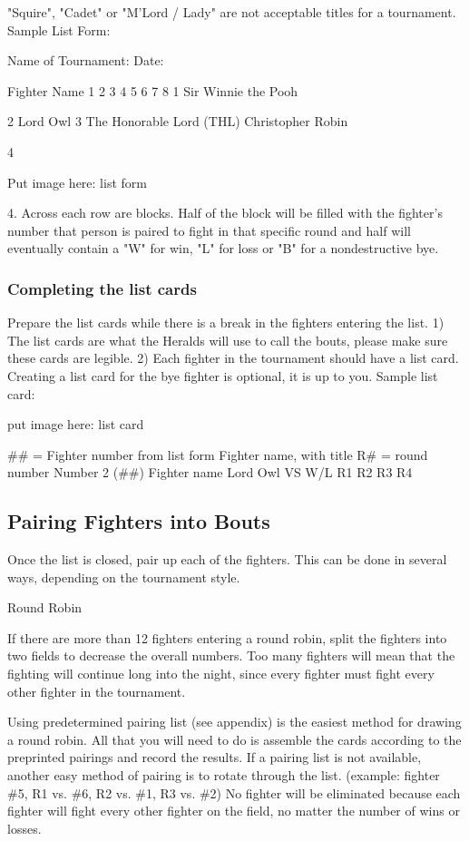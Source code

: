 \documentclass{article}
\begin{document}
"Squire", "Cadet" or "M’Lord / Lady" are not acceptable titles for a tournament.
Sample List Form:

Name of Tournament: Date:

Fighter Name 1 2 3 4 5 6 7 8
1 Sir Winnie the Pooh

2 Lord Owl
3
The Honorable Lord (THL)
Christopher Robin

4

Put image here: list form


4. Across each row are blocks. Half of the block will be filled with the fighter’s number that person is
paired to fight in that specific round and half will eventually contain a "W" for win, "L" for loss or
"B" for a nondestructive bye.


\subsubsection{Completing the list cards}

Prepare the list cards while there is a break in the fighters entering the list.
1) The list cards are what the Heralds will use to call the bouts, please make sure these cards are legible.
2) Each fighter in the tournament should have a list card. Creating a list card for the bye fighter is
optional, it is up to you.
Sample list card:

put image here: list card

\#\# = Fighter number from list form
Fighter name, with title
R\# = round number
Number 2 (\#\#)
Fighter name
Lord Owl
VS W/L
R1
R2
R3
R4


\subsection{Pairing Fighters into Bouts}
Once the list is closed, pair up each of the fighters. This can be done in several ways, depending on the
tournament style.

Round Robin

If there are more than 12 fighters entering a round robin, split the fighters into two fields to decrease the
overall numbers. Too many fighters will mean that the fighting will continue long into the night, since
every fighter must fight every other fighter in the tournament.

Using predetermined pairing list (see appendix) is the easiest method for drawing a round robin. All that
you will need to do is assemble the cards according to the preprinted pairings and record the results. If a
pairing list is not available, another easy method of pairing is to rotate through the list. (example: fighter
\#5, R1 vs. \#6, R2 vs. \#1, R3 vs. \#2) No fighter will be eliminated because each fighter will fight every
other fighter on the field, no matter the number of wins or losses.
\end{document}
